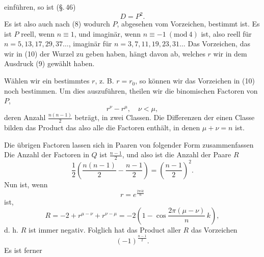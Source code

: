 
einführen, so ist (\S.\,46)
\[
D = P^2.
\]
Es ist also auch nach (8)
wodurch $P$, abgesehen vom Vorzeichen, bestimmt ist. Es ist $P$ reell, wenn $n \equiv 1$, und imaginär, wenn $n \equiv -1 \ (\mathrm{mod}\ 4)$ ist, also reell für $n = 5, 13, 17, 29, 37 \ldots$, imaginär für $n = 3, 7, 11, 19, 23, 31 \ldots$ Das Vorzeichen, das wir in (10) der Wurzel zu geben haben, hängt davon ab, welches $r$ wir in dem Ausdruck (9) gewählt haben.

Wählen wir ein bestimmtes $r$, z. B. $r = r_0$, so können wir das Vorzeichen in (10) noch bestimmen. Um dies auszuführen, theilen wir die binomischen Factoren von $P$,
\[
r^\nu - r^\mu, \quad \nu < \mu,
\]
deren Anzahl $\frac{n(n-1)}{2}$ beträgt, in zwei Classen. Die Differenzen der einen Classe bilden das Product
das also alle die Factoren enthält, in denen $\mu + \nu = n$ ist.

Die übrigen Factoren lassen sich in Paaren von folgender Form zusammenfassen
Die Anzahl der Factoren in $Q$ ist $\frac{n-1}{2}$, und also ist die Anzahl der Paare $R$
\[
\frac{1}{2}\left(\frac{n(n-1)}{2} - \frac{n-1}{2}\right) = \left(\frac{n-1}{2}\right)^2.
\]
Nun ist, wenn
\[
r = e^{\frac{2\pi i k}{n}}
\]
ist,
\[
R = -2 + r^{\mu-\nu} + r^{\nu-\mu} = -2\left(1 - \cos\frac{2\pi(\mu-\nu)}{n}\,k\right),
\]
d. h. $R$ ist immer negativ. Folglich hat das Product aller $R$ das Vorzeichen
\[
(-1)^{\frac{n-1}{2}}.
\]
Es ist ferner
